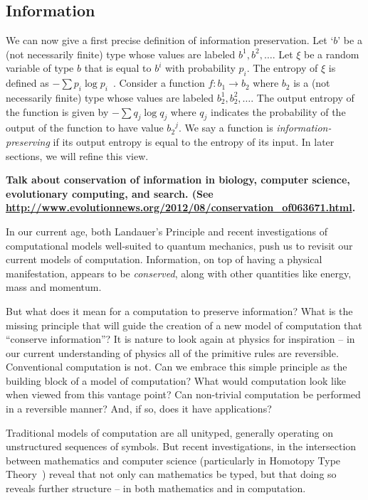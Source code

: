 \documentclass{article}
\newcommand{\amr}[1]{\fbox{Amr says:} \textbf{#1}}
\begin{document}
\subsection{Information}

We can now give a first precise definition of information preservation.
Let
`$b$' be a (not necessarily finite) type whose values are labeled
$b^1, b^2, \ldots$. Let $\xi$ be a random variable of type $b$ that is
equal to $b^i$ with probability $p_i$. The entropy of $\xi$ is defined
as $-\sum p_i \log{p_i}$~\cite{Shannon1948}.  Consider a function
$f : b_1 \rightarrow b_2$ where $b_2$ is a (not necessarily finite)
type whose values are labeled $b_2^1, b_2^2, \ldots$. The output
entropy of the function is given by $- \sum q_j \log{q_j}$ where $q_j$
indicates the probability of the output of the function to have value
${b_2}^j$. We say a function is \emph{information-preserving} if its
output entropy is equal to the entropy of its input. In later sections,
we will refine this view.

\amr{
Talk about conservation of information in biology, computer science,
evolutionary computing, and search. (See
\url{http://www.evolutionnews.org/2012/08/conservation_of063671.html}.
}

In our current age, both Landauer's Principle and recent investigations
of computational models well-suited to quantum mechanics, push us to
revisit our current models of computation. Information, on top of
having a physical manifestation, appears to be \emph{conserved},
along with other quantities like energy, mass and momentum.

But what does it mean for a computation to preserve information?
What is the missing principle that will guide the creation of a new
model of computation that ``conserve information''?
It is nature to look again at physics for inspiration --
in our current understanding of physics all of the primitive rules
are reversible. Conventional computation is not. Can
we embrace this simple principle as the building block of a model of
computation? What would computation look like when viewed from this
vantage point? Can non-trivial computation be performed in a
reversible manner? And, if so, does it have applications?

Traditional models of computation are all unityped, generally
operating on unstructured sequences of symbols. But recent
investigations, in the intersection between mathematics and
computer science (particularly in Homotopy Type Theory~\cite{hottbook})
reveal that not only can mathematics be typed, but that doing so
reveals further structure -- in both mathematics and in computation.
\end{document}
